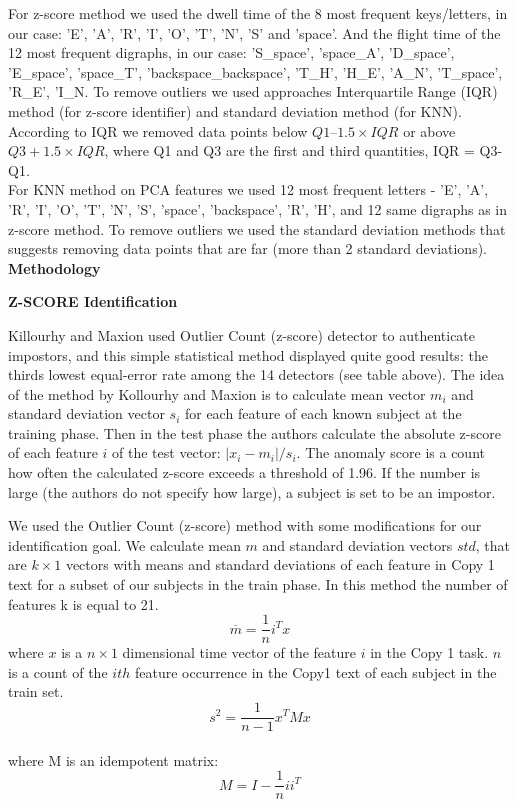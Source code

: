 \documentclass[12pt,a4]{article}
\begin{document}
For z-score method we used the dwell time of the 8 most frequent keys/letters, in our case: 
'E', 'A', 'R', 'I', 'O', 'T', 'N', 'S' and 'space'. And the flight time of the 12 most frequent digraphs, in our case: 'S\_space', 'space\_A', 'D\_space', 'E\_space', 'space\_T', 'backspace\_backspace', 'T\_H', 'H\_E', 'A\_N', 'T\_space', 'R\_E', 'I\_N.
To remove outliers we used approaches Interquartile Range (IQR) method (for z-score identifier) and standard deviation method (for KNN). According to IQR we removed data points below $Q1 – 1.5×IQR$ or above $Q3 + 1.5×IQR$, where Q1 and Q3 are the first and third quantities, IQR = Q3-Q1. \\

For KNN method on PCA features we used 12 most frequent letters - 'E', 'A', 'R', 'I', 'O', 'T', 'N', 'S', 'space', 'backspace', 'R', 'H', and 12 same digraphs as in z-score method. To remove outliers we used the standard deviation methods that suggests removing data points that are far (more than 2 standard deviations).\\


\bigskip
\large\textbf{Methodology }
\bigskip

\medskip
\small\textbf{Z-SCORE Identification}
\medskip

\normalsize

Killourhy and Maxion \cite{killourhy2009comparing} used Outlier Count (z-score) detector to authenticate impostors, and this simple statistical method displayed quite good results: the thirds lowest equal-error rate among the 14 detectors (see table above).  The idea of the method by Kollourhy and Maxion is to calculate mean vector $m_i$ and standard deviation vector $s_i$ for each feature of each known subject at the training phase. Then in the test phase the authors calculate the absolute z-score of each feature $i$ of the test vector: $|x_i-m_i|/s_i$. The anomaly score is a count how often the calculated z-score exceeds a threshold of 1.96. If the number is large (the authors do not specify how large), a subject is set to be an impostor. 

We used the Outlier Count (z-score) method with some modifications for our identification goal. We calculate mean $m$ and standard deviation vectors $std$, that are $k \times 1$ vectors with means and standard deviations of each feature in Copy 1 text for a subset of our subjects in the train phase. In this method the number of features k is equal to 21.
$$
\overline{m} = \frac{1}{n}i^T x
$$
 where $x$ is a $n\times 1$ dimensional time vector of the feature $i$ in the Copy 1 task. $n$ is a count of the $ith$ feature occurrence in the Copy1 text of each subject in the train set. \\
$$
s^2 = \frac{1}{n-1} x^T M x
$$
\\
where M  is an idempotent matrix: 
$$
M = I - \frac{1}{n}ii^T
$$
\end{document}
